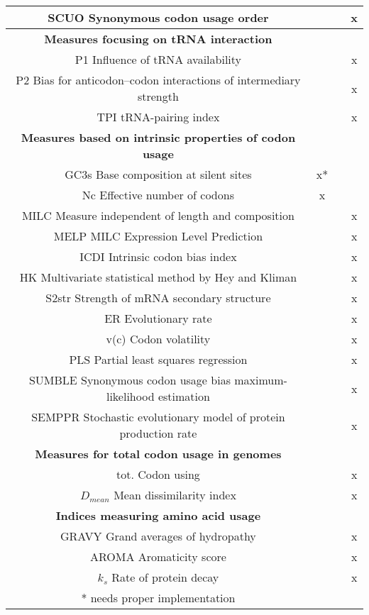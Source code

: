 \begin{table}[tb]
\begin{footnotesize}
\begin{tabular}{cccc}
	SCUO	 Synonymous codon usage order	& & & x	 \\
\midrule	
\textbf{Measures focusing on tRNA interaction} \\
	P1	Influence of tRNA availability	& & & x	 \\
	P2	Bias for anticodon–codon interactions of intermediary strength	& & & x	 \\
	TPI	tRNA-pairing index	& & & x	 \\
\midrule	
\textbf{Measures based on intrinsic properties of codon usage} \\
	GC3s	 Base composition at silent sites	& x* & &	 \\
	Nc	Effective number of codons	& x & &	 \\
	MILC	 Measure independent of length and composition	& & & x	 \\
	MELP	 MILC Expression Level Prediction	& & & x	 \\
	ICDI	 Intrinsic codon bias index	& & & x	 \\
	HK	Multivariate statistical method by Hey and Kliman	& & & x	 \\
	S2str Strength of mRNA secondary structure	& & & x	 \\
	ER	Evolutionary rate	& & & x	 \\
	v(c)	 Codon volatility	& & & x	 \\
	PLS	Partial least squares regression	& & & x	 \\
	SUMBLE	Synonymous codon usage bias maximum-likelihood estimation	& & & x	 \\
	SEMPPR	Stochastic evolutionary model of protein production rate	& & & x	 \\
	\midrule	
\textbf{Measures for total codon usage in genomes} \\
	tot. Codon using		& & & x	 \\
	$D_{mean}$	Mean dissimilarity index 	& & & x	 \\
		\midrule	
\textbf{Indices measuring amino acid usage} \\
	GRAVY	Grand averages of hydropathy	& & & x	 \\
	AROMA	Aromaticity score	& & & x	 \\
	$k_s$	Rate of protein decay	& & & x	 \\
\bottomrule 

* needs proper implementation
\end{tabular}
\end{footnotesize}
\end{table}



